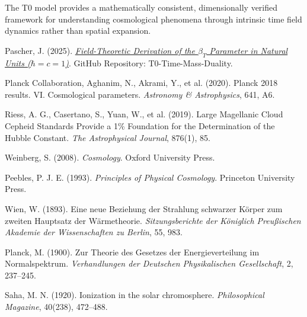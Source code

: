 \documentclass[12pt,a4paper]{article}
\begin{document}
	The T0 model provides a mathematically consistent, dimensionally verified framework for understanding cosmological phenomena through intrinsic time field dynamics rather than spatial expansion.
	
	\begin{thebibliography}{99}
Pascher, J. (2025). \href{https://github.com/jpascher/T0-Time-Mass-Duality/blob/main/2/pdf/DerivationVonBetaEn.pdf}{\textit{Field-Theoretic Derivation of the $\beta_T$ Parameter in Natural Units ($\hbar = c = 1$)}}. GitHub Repository: T0-Time-Mass-Duality.
		
		Planck Collaboration, Aghanim, N., Akrami, Y., et al. (2020). Planck 2018 results. VI. Cosmological parameters. \textit{Astronomy \& Astrophysics}, 641, A6.
		
		Riess, A. G., Casertano, S., Yuan, W., et al. (2019). Large Magellanic Cloud Cepheid Standards Provide a 1\% Foundation for the Determination of the Hubble Constant. \textit{The Astrophysical Journal}, 876(1), 85.
		
		Weinberg, S. (2008). \textit{Cosmology}. Oxford University Press.
		
		Peebles, P. J. E. (1993). \textit{Principles of Physical Cosmology}. Princeton University Press.
		
		Wien, W. (1893). Eine neue Beziehung der Strahlung schwarzer Körper zum zweiten Hauptsatz der Wärmetheorie. \textit{Sitzungsberichte der Königlich Preußischen Akademie der Wissenschaften zu Berlin}, 55, 983.
		
		Planck, M. (1900). Zur Theorie des Gesetzes der Energieverteilung im Normalspektrum. \textit{Verhandlungen der Deutschen Physikalischen Gesellschaft}, 2, 237--245.
		
		Saha, M. N. (1920). Ionization in the solar chromosphere. \textit{Philosophical Magazine}, 40(238), 472--488.
	\end{thebibliography}
	
\end{document}
